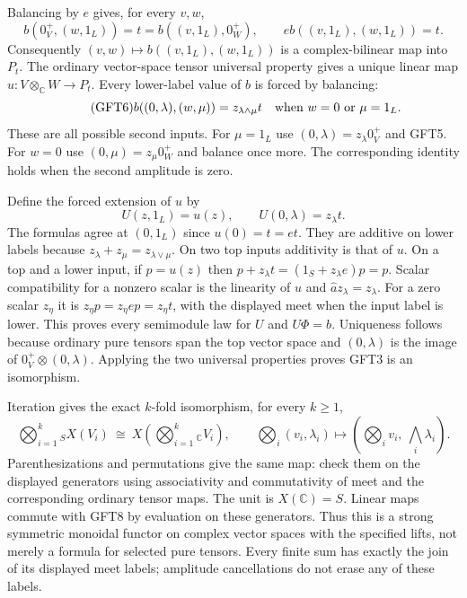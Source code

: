 Balancing by $e$ gives, for every $v,w$,
\begin{equation}\tag{GFT5}
 b(0_V^+,(w,1_L))=t=b((v,1_L),0_W^+),\qquad
 e b((v,1_L),(w,1_L))=t.
\end{equation}
Consequently $(v,w)\mapsto b((v,1_L),(w,1_L))$ is a
complex-bilinear map into $P_t$. The ordinary vector-space tensor
universal property gives a unique linear map
$u:V\otimes_{\mathbb C}W\to P_t$. Every lower-label value of
$b$ is forced by balancing:
\begin{equation}\tag{GFT6}
 b((0,\lambda),(w,\mu))=z_{\lambda\wedge\mu}t
 \quad\hbox{when }w=0\hbox{ or }\mu=1_L.
\end{equation}
These are all possible second inputs. For $\mu=1_L$ use
$(0,\lambda)=z_\lambda0_V^+$ and GFT5. For $w=0$ use
$(0,\mu)=z_\mu0_W^+$ and balance once more. The corresponding
identity holds when the second amplitude is zero.

Define the forced extension of $u$ by
\begin{equation}\tag{GFT7}
 U(z,1_L)=u(z),\qquad U(0,\lambda)=z_\lambda t.
\end{equation}
The formulas agree at $(0,1_L)$ since $u(0)=t=et$.
They are additive on lower labels because
$z_\lambda+z_\mu=z_{\lambda\vee\mu}$. On two top inputs
additivity is that of $u$. On a top and a lower input, if
$p=u(z)$ then
$p+z_\lambda t=(1_S+z_\lambda e)p=p$.
Scalar compatibility for a nonzero scalar is the linearity of
$u$ and $\widehat a z_\lambda=z_\lambda$. For a zero scalar
$z_\eta$ it is $z_\eta p=z_\eta ep=z_\eta t$, with the
displayed meet when the input label is lower. This proves every
semimodule law for $U$ and $U\Phi=b$. Uniqueness follows because
ordinary pure tensors span the top vector space and
$(0,\lambda)$ is the image of $0_V^+\otimes(0,\lambda)$.
Applying the two universal properties proves GFT3 is an isomorphism.

Iteration gives the exact $k$-fold isomorphism, for every $k\ge1$,
\begin{equation}\tag{GFT8}
 \bigotimes_{i=1}^k{}_S X(V_i)
       \ \cong\ X\left(\bigotimes_{i=1}^k{}_{\mathbb C}V_i\right),
 \qquad
 \bigotimes_i(v_i,\lambda_i)\longmapsto
              \left(\bigotimes_i v_i,\ \bigwedge_i\lambda_i\right).
\end{equation}
Parenthesizations and permutations give the same map: check them
on the displayed generators using associativity and commutativity
of meet and the corresponding ordinary tensor maps. The unit is
$X(\mathbb C)=S$. Linear maps commute with GFT8 by evaluation on
these generators. Thus this is a strong symmetric monoidal functor
on complex vector spaces with the specified lifts, not merely a
formula for selected pure tensors. Every finite sum has exactly
the join of its displayed meet labels; amplitude cancellations do
not erase any of these labels.

